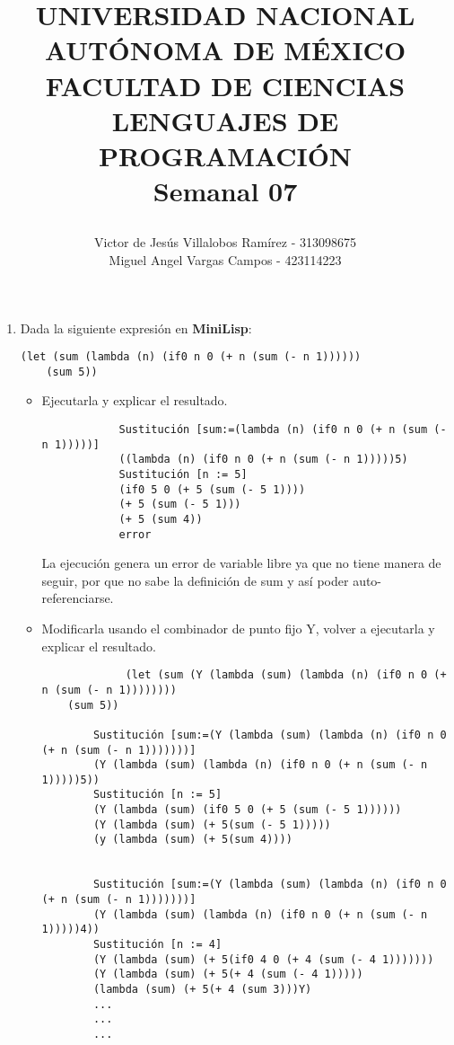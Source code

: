 \documentclass[12pt,letterpaper]{article}
\title{
		\vspace{-0.7in} 	
		\usefont{OT1}{bch}{b}{n}
		
		\begin{minipage}{3cm}
        \vspace{-0.5in} 	
    	\begin{center}
    	\end{center}
    \end{minipage}\hfill
    \begin{minipage}{10.7cm}
    	\begin{center}

\normalfont \normalsize \textsc{UNIVERSIDAD NACIONAL AUTÓNOMA DE MÉXICO \\ FACULTAD DE CIENCIAS \\ LENGUAJES DE PROGRAMACIÓN } \\
		\huge Semanal 07

    	\end{center}
     
    \end{minipage}\hfill
    \begin{minipage}{3.2cm}
    \vspace{-0.5in} 
    	\begin{center}
    	\end{center}
    \end{minipage}

\author{Victor de Jesús Villalobos Ramírez - 313098675 \\ Miguel Angel Vargas Campos - 423114223}
\date{}

}
\begin{document}
\maketitle

\begin{enumerate}
    \item Dada la siguiente expresión en \textbf{MiniLisp}:
\begin{verbatim}
(let (sum (lambda (n) (if0 n 0 (+ n (sum (- n 1))))))
    (sum 5))
\end{verbatim}
    \begin{itemize}
        \item Ejecutarla y explicar el resultado.
        \begin{verbatim}
            Sustitución [sum:=(lambda (n) (if0 n 0 (+ n (sum (- n 1)))))]
            ((lambda (n) (if0 n 0 (+ n (sum (- n 1)))))5)
            Sustitución [n := 5]
            (if0 5 0 (+ 5 (sum (- 5 1)))) 
            (+ 5 (sum (- 5 1))) 
            (+ 5 (sum 4))
            error

        \end{verbatim}

         La ejecución genera un error de variable libre ya que no tiene manera de seguir, por que no sabe la definición de sum y así poder auto-referenciarse. \\ 
        
        \item Modificarla usando el combinador de punto fijo Y, volver a ejecutarla y explicar el resultado.
         \begin{verbatim}
             (let (sum (Y (lambda (sum) (lambda (n) (if0 n 0 (+ n (sum (- n 1))))))))
    (sum 5))

        Sustitución [sum:=(Y (lambda (sum) (lambda (n) (if0 n 0 (+ n (sum (- n 1)))))))]
        (Y (lambda (sum) (lambda (n) (if0 n 0 (+ n (sum (- n 1)))))5))
        Sustitución [n := 5]
        (Y (lambda (sum) (if0 5 0 (+ 5 (sum (- 5 1))))))
        (Y (lambda (sum) (+ 5(sum (- 5 1)))))
        (y (lambda (sum) (+ 5(sum 4))))
        

        Sustitución [sum:=(Y (lambda (sum) (lambda (n) (if0 n 0 (+ n (sum (- n 1)))))))]
        (Y (lambda (sum) (lambda (n) (if0 n 0 (+ n (sum (- n 1)))))4))
        Sustitución [n := 4]
        (Y (lambda (sum) (+ 5(if0 4 0 (+ 4 (sum (- 4 1)))))))
        (Y (lambda (sum) (+ 5(+ 4 (sum (- 4 1)))))
        (lambda (sum) (+ 5(+ 4 (sum 3)))Y)
        ...
        ...
        ...


\end{verbatim}
\end{itemize}
\end{enumerate}
\end{document}
